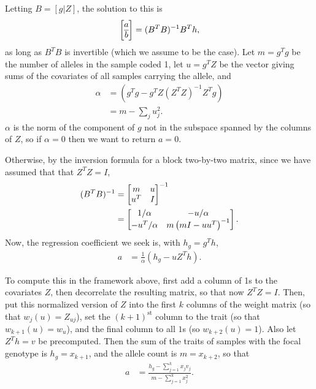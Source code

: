 \documentclass{article}
\begin{document}
Letting $B = [g | Z]$, the solution to this is
\begin{align*}
    \left[\begin{array}{@{}c@{}}a\\\hline b\end{array}\right]
        = (B^T B)^{-1} B^T h ,
\end{align*}
as long as $B^T B$ is invertible (which we assume to be the case).
Let $m = g^T g$ be the number of alleles in the sample coded 1,
let $u = g^T Z$ be the vector giving sums of the covariates of all samples carrying the allele,
and
\begin{align*}
    \alpha
    &=
        (g^T g - g^T Z (Z^T Z)^{-1} Z^T g) \\
    &=
        m - \sum_j u_j^2 .
\end{align*}
$\alpha$ is the norm of the component of $g$ not in the subspace spanned by the columns of $Z$,
so if $\alpha = 0$ then we want to return $a=0$.

Otherwise, by the inversion formula for a block two-by-two matrix,
since we have assumed that that $Z^T Z = I$,
\begin{align*}
    (B^T B)^{-1}
    &=
    \left[
        \begin{array}{@{}cc@{}}
            m & u \\
            u^T & I
        \end{array}
    \right]^{-1} \\
    &=
    \left[
        \begin{array}{@{}cc@{}}
            1/\alpha
            &
            - u / \alpha
            \\
            - u^T / \alpha
            &
            m \left(m I - u u^T \right)^{-1}
        \end{array}
    \right] .
\end{align*}
Now, the regression coefficient we seek is,
with $h_g = g^T h$,
\begin{align*}
    a
    &=
    \frac{1}{\alpha} \left(
        h_g - u Z^T h
    \right) .
\end{align*}

To compute this in the framework above,
first add a column of 1s to the covariates $Z$,
then decorrelate the resulting matrix, so that now $Z^T Z = I$.
Then, put this normalized version of $Z$
into the first $k$ columns of the weight matrix (so that $w_j(u) = Z_{uj}$),
set the $(k+1)^\text{st}$ column to the trait (so that $w_{k+1}(u) = w_u$),
and the final column to all $1$s (so $w_{k+2}(u) = 1$).
Also let $Z^T h = v$ be precomputed.
Then the sum of the traits of samples with the focal genotype is $h_g = x_{k+1}$,
and the allele count is $m = x_{k+2}$,
so that
\begin{align*}
    a
    &=
    \frac{
        h_g - \sum_{j=1}^k x_j v_j
    }{
        m - \sum_{j=1}^k x_j^2 } .
\end{align*}
\end{document}
